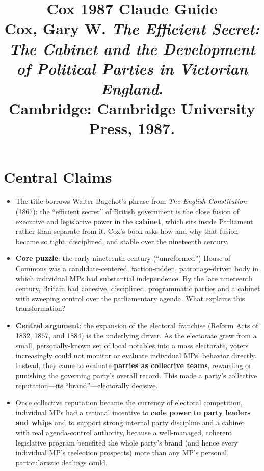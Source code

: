 \documentclass[12pt]{article}
\title{\textbf{Cox 1987 Claude Guide}\\
\large Cox, Gary W. \textit{The Efficient Secret: The Cabinet and the Development of Political Parties in Victorian England}.\\
Cambridge: Cambridge University Press, 1987.}
\author{}
\date{}
\begin{document}
\maketitle
\tableofcontents
\newpage

\section{Central Claims}

\begin{itemize}[leftmargin=*, itemsep=4pt]
    \item The title borrows Walter Bagehot's phrase from \textit{The English Constitution} (1867): the ``efficient secret'' of British government is the close fusion of executive and legislative power in the \textbf{cabinet}, which sits inside Parliament rather than separate from it. Cox's book asks how and why that fusion became so tight, disciplined, and stable over the nineteenth century.
    \item \textbf{Core puzzle}: the early-nineteenth-century (``unreformed'') House of Commons was a candidate-centered, faction-ridden, patronage-driven body in which individual MPs had substantial independence. By the late nineteenth century, Britain had cohesive, disciplined, programmatic parties and a cabinet with sweeping control over the parliamentary agenda. What explains this transformation?
    \item \textbf{Central argument}: the expansion of the electoral franchise (Reform Acts of 1832, 1867, and 1884) is the underlying driver. As the electorate grew from a small, personally-known set of local notables into a mass electorate, voters increasingly could not monitor or evaluate individual MPs' behavior directly. Instead, they came to evaluate \textbf{parties as collective teams}, rewarding or punishing the governing party's overall record. This made a party's collective reputation---its ``brand''---electorally decisive.
    \item Once collective reputation became the currency of electoral competition, individual MPs had a rational incentive to \textbf{cede power to party leaders and whips} and to support strong internal party discipline and a cabinet with real agenda-control authority, because a well-managed, coherent legislative program benefited the whole party's brand (and hence every individual MP's reelection prospects) more than any MP's personal, particularistic dealings could.

\end{itemize}
\end{document}
